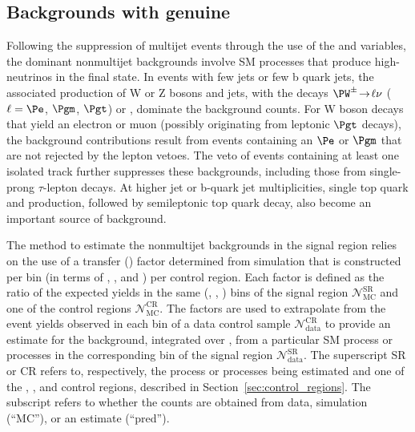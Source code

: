 \subsection{Backgrounds with genuine \texorpdfstring{\ETmiss}{MET}}
\label{sec:ewk_background}

Following the suppression of multijet events through the use of the
\alphat and \bdphi variables, the dominant nonmultijet backgrounds
involve SM processes that produce high-\Pt neutrinos in the final
state. In events with few jets or few b quark jets, the associated
production of W or Z bosons and jets, with the decays $\PW^\pm
\!\rightarrow\! \ell\nu$ ($\ell=\Pe$, $\Pgm$, $\Pgt$) or \znunu,
dominate the background counts. For W boson decays that yield an
electron or muon (possibly originating from leptonic $\Pgt$ decays),
the background contributions result from events containing an $\Pe$ or
$\Pgm$ that are not rejected by the lepton vetoes. 
The veto of events containing at least one isolated track further
suppresses these backgrounds, including those from single-prong
$\tau$-lepton decays. At higher jet or b-quark jet multiplicities,
single top quark and \ttbar production, followed by semileptonic top
quark decay, also become an important source of background.

The method to estimate the nonmultijet backgrounds in the signal
region relies on the use of a transfer (\tf) factor determined from
simulation that is constructed per bin (in terms of \njet, \nb, and
\scalht) per control region. Each \tf factor is defined as the ratio
of the expected yields in the same (\njet, \nb, \scalht) bins of the
signal region $\mathcal{N}^\text{SR}_\text{MC}$ and one of the control
regions $\mathcal{N}^\text{CR}_\text{MC}$.  The \tf factors are used to
extrapolate from the event yields observed in each bin of a data
control sample $\mathcal{N}^\text{CR}_\text{data}$ to provide an
estimate for the background, integrated over \HTmiss, from a
particular SM process or processes in the corresponding bin of the
signal region $\mathcal{N}^\text{SR}_\text{data}$.  The superscript SR
or CR refers to, respectively, the process or processes being
estimated and one of the \mj, \mmj, and \gj control regions, described
in Section~\ref{sec:control_regions}. The subscript refers to whether
the counts are obtained from data, simulation (``MC''), or an estimate
(``pred'').


